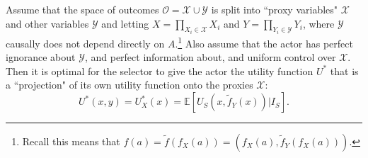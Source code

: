 \newcommand{\theoremgeneralizedsideeffectalignment}{
Assume that the space of outcomes $\mathcal O=\mathcal X\cup \mathcal Y$ is split into ``proxy variables" $\mathcal X$ and other variables $\mathcal Y$ and letting $X=\prod _{X_i\in \mathcal X}X_i$ and $Y=\prod _{Y_i\in \mathcal Y}Y_i$, where $\mathcal Y$ causally does not depend directly on $A$.\footnote{Recall this means that $f(a)=\tilde f(f_X(a))=(f_X(a),\tilde f_Y(f_X (a)))$. } Also assume that the actor has perfect ignorance about $\mathcal Y$, and perfect information about, and uniform control over $\mathcal X$. Then it is optimal for the selector to give the actor the utility function $U^*$ that is a ``projection" of its own utility function onto the proxies $\mathcal X$:   
\[U^*(x,y)=U^*_{X}(x)=\mathbb E[U_S(x,\tilde f_Y(x))|I_S].\]
}
\begin{theorem}\label{theorem:generalizedsideeffectalignment}
	\theoremgeneralizedsideeffectalignment

\end{theorem}

